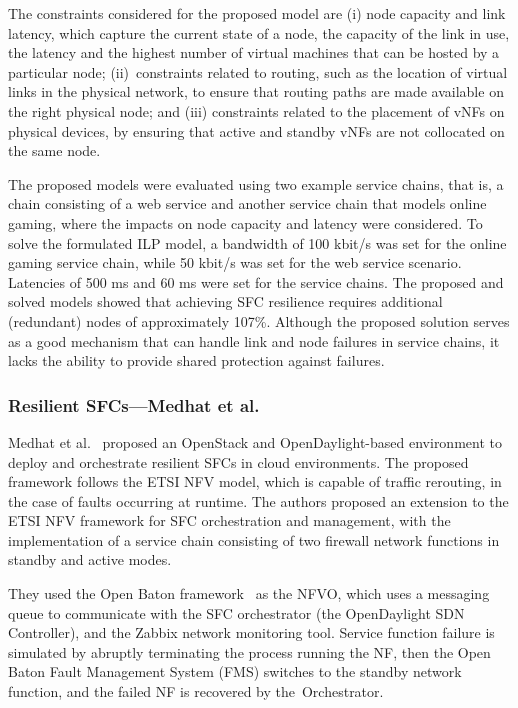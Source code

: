 \documentclass[futureinternet,review,accept,pdftex,moreauthors]{Definitions/mdpi}
\begin{document}
The constraints considered for the proposed model are (i) node capacity and link latency, which capture the current state of a node, the capacity of the link in use, the latency and the highest number of virtual machines that can be hosted by a particular node; (ii)~constraints related to routing, such as the location of virtual links in the physical network, to ensure that routing paths are made available on the right physical node; and (iii) constraints related to the placement of vNFs on physical devices, by ensuring that active and standby vNFs are not collocated on the same node.

The proposed models were evaluated using two example service chains, that is, a chain consisting of a web service and another service chain that models online gaming, where the impacts on node capacity and latency were considered. To solve the formulated ILP model, a bandwidth of 100 kbit/s was set for the online gaming service chain, while 50 kbit/s was set for the web service scenario. Latencies of 500 ms and 60 ms were set for the service chains. The proposed and solved models showed that achieving SFC resilience requires additional (redundant) nodes of approximately 107\%. Although the proposed solution serves as a good mechanism that can handle link and node failures in service chains, it lacks the ability to provide shared protection against failures.    


\subsubsection{Resilient SFCs---Medhat et al.}
\label{Medhat et al.}

Medhat {et al.}~\cite{medhat2016resilient} proposed an OpenStack and OpenDaylight-based environment to deploy and orchestrate resilient SFCs in cloud environments. The proposed framework follows the ETSI NFV model, which is capable of traffic rerouting, in the case of faults occurring at runtime. The authors proposed an extension to the ETSI NFV framework for SFC orchestration and management, with the implementation of a service chain consisting of two firewall network functions in standby and active modes. 

They  used the Open Baton framework~\cite{carella2015open} as the NFVO, which uses a messaging queue to communicate with the SFC orchestrator (the OpenDaylight SDN Controller), and the Zabbix network monitoring tool. Service function failure is simulated by abruptly terminating the process running the NF, then the Open Baton Fault Management System (FMS) switches to the standby network function, and the failed NF is recovered by the~Orchestrator.
\end{document}

